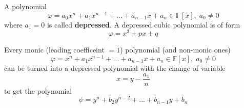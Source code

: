 \documentclass{article}
\begin{document}
      \begin{definition}
        A polynomial 
        \begin{equation}
          \varphi = a_0 x^n + a_1 x^{n-1} + ... + a_{n-1} x + a_n \in \mathbb{F}[x], \; a_0 \neq 0
        \end{equation}
        where $a_1 = 0$ is called \textbf{depressed}. A depressed cubic polynomial is of form
        \begin{equation}
          \varphi = x^3 + p x + q
        \end{equation}
      \end{definition}

      \begin{proposition}
        Every monic (leading coefficeint $=1$) polynomial (and non-monic ones) 
        \begin{equation}
          \varphi = x^n + a_1 x^{n-1} + ... + a_{n-1} x + a_n \in \mathbb{F}[x], \; a_0 \neq 0
        \end{equation}
        can be turned into a depressed polynomial with the change of variable
        \begin{equation}
          x = y - \frac{a_1}{n}
        \end{equation}
        to get the polynomial 
        \begin{equation}
          \psi = y^n + b_2 y^{n-2} + ... + b_{n-1} y + b_n
        \end{equation}
      \end{proposition}
\end{document}
